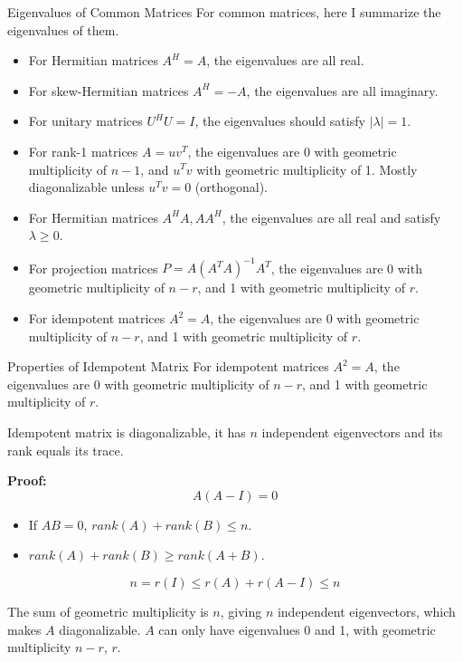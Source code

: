 \documentclass{beamer}
\begin{document}
\begin{frame}{Eigenvalues of Common Matrices}
For common matrices, here I summarize the eigenvalues of them.
\begin{itemize}
    \item For Hermitian matrices $A^H=A$, the eigenvalues are all real.
    \item For skew-Hermitian matrices $A^H=-A$, the eigenvalues are all imaginary.
    \item For unitary matrices $U^HU=I$, the eigenvalues should satisfy $|\lambda|=1$.
    \item For rank-1 matrices $A=uv^T$, the eigenvalues are 0 with geometric multiplicity of $n-1$, and $u^Tv$ with geometric multiplicity of 1. Mostly diagonalizable unless $u^Tv=0$ (orthogonal).
    \item For Hermitian matrices $A^HA, AA^H$, the eigenvalues are all real and satisfy $\lambda \geq 0$.
    \item For projection matrices $P=A(A^TA)^{-1}A^T$, the eigenvalues are 0 with geometric multiplicity of $n-r$, and 1 with geometric multiplicity of $r$.
    \item For idempotent matrices $A^2=A$, the eigenvalues are 0 with geometric multiplicity of $n-r$, and 1 with geometric multiplicity of $r$.
\end{itemize}
\end{frame}

\begin{frame}{Properties of Idempotent Matrix}
For idempotent matrices $A^2=A$, the eigenvalues are 0 with geometric multiplicity of $n-r$, and 1 with geometric multiplicity of $r$.

\vspace{3pt}
Idempotent matrix is diagonalizable, it has $n$ independent eigenvectors and its rank equals its trace.

\vspace{5pt}

\textbf{Proof:}
\begin{equation*}
    A\left( A-I \right) =0
\end{equation*}

\begin{itemize}
    \item If $AB=0$, $rank(A)+rank(B)\leq n$.
    \item $rank(A)+rank(B)\geq  rank(A+B)$.
\end{itemize}

\begin{equation*}
    n=r\left( I \right) \leqslant r\left( A \right) +r\left( A-I \right) \leqslant n
\end{equation*}

The sum of geometric multiplicity is $n$, giving $n$ independent eigenvectors, which makes $A$ diagonalizable. $A$ can only have eigenvalues 0 and 1, with geometric multiplicity $n-r$, $r$.
\end{frame}
\end{document}
